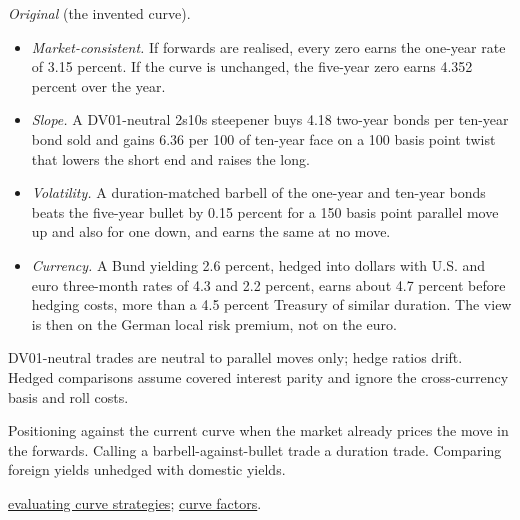 \begin{qfmethod}
 \emph{Original} (the invented curve).
\begin{itemize}
\item \emph{Market-consistent.} If forwards are realised, every zero earns the one-year rate of 3.15 percent. If the curve is unchanged, the five-year zero earns 4.352 percent over the year.
\item \emph{Slope.} A DV01-neutral 2s10s steepener buys 4.18 two-year bonds per ten-year bond sold and gains 6.36 per 100 of ten-year face on a 100 basis point twist that lowers the short end and raises the long.
\item \emph{Volatility.} A duration-matched barbell of the one-year and ten-year bonds beats the five-year bullet by 0.15 percent for a 150 basis point parallel move up and also for one down, and earns the same at no move.
\item \emph{Currency.} A Bund yielding 2.6 percent, hedged into dollars with U.S. and euro three-month rates of 4.3 and 2.2 percent, earns about 4.7 percent before hedging costs, more than a 4.5 percent Treasury of similar duration. The view is then on the German local risk premium, not on the euro.
\end{itemize}

 DV01-neutral trades are neutral to parallel moves only; hedge ratios drift. Hedged comparisons assume covered interest parity and ignore the cross-currency basis and roll costs.

 Positioning against the current curve when the market already prices the move in the forwards. Calling a barbell-against-bullet trade a duration trade. Comparing foreign yields unhedged with domestic yields.

 \hyperref[meth:curve-strategy-evaluation]{evaluating curve strategies}; \hyperref[meth:yield-curve-factor-exposures]{curve factors}.

\end{qfmethod}

